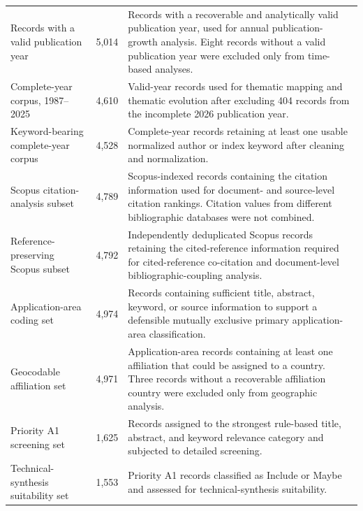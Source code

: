 \documentclass[12pt]{article}
\numberwithin{equation}{section}
\begin{document}
\begin{longtable}{
@{}
L{3.8cm}
C{1.5cm}
L{8.0cm}
@{}
}
Records with a valid publication year
&
5,014
&
Records with a recoverable and analytically valid publication year,
used for annual publication-growth analysis. Eight records without a
valid publication year were excluded only from time-based analyses.
\\

Complete-year corpus, 1987--2025
&
4,610
&
Valid-year records used for thematic mapping and thematic evolution
after excluding 404 records from the incomplete 2026 publication year.
\\

Keyword-bearing complete-year corpus
&
4,528
&
Complete-year records retaining at least one usable normalized author
or index keyword after cleaning and normalization.
\\

Scopus citation-analysis subset
&
4,789
&
Scopus-indexed records containing the citation information used for
document- and source-level citation rankings. Citation values from
different bibliographic databases were not combined.
\\

Reference-preserving Scopus subset
&
4,792
&
Independently deduplicated Scopus records retaining the cited-reference
information required for cited-reference co-citation and document-level
bibliographic-coupling analysis.
\\

Application-area coding set
&
4,974
&
Records containing sufficient title, abstract, keyword, or source
information to support a defensible mutually exclusive primary
application-area classification.
\\

Geocodable affiliation set
&
4,971
&
Application-area records containing at least one affiliation that
could be assigned to a country. Three records without a recoverable
affiliation country were excluded only from geographic analysis.
\\

Priority A1 screening set
&
1,625
&
Records assigned to the strongest rule-based title, abstract, and
keyword relevance category and subjected to detailed screening.
\\

Technical-synthesis suitability set
&
1,553
&
Priority A1 records classified as Include or Maybe and assessed for
technical-synthesis suitability.
\\

\midrule


\end{longtable}
\end{document}
